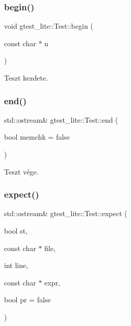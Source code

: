 \subsubsection{\texorpdfstring{begin()}{begin()}}
{\footnotesize\ttfamily void gtest\+\_\+lite\+::\+Test\+::begin (\begin{DoxyParamCaption}\item[{const char $\ast$}]{n }\end{DoxyParamCaption})\hspace{0.3cm}{\ttfamily [inline]}}



Teszt kezdete. 

\mbox{\label{structgtest__lite_1_1_test_a658c1eee35f170294c354ebf4d3fc1ba}} 
\subsubsection{\texorpdfstring{end()}{end()}}
{\footnotesize\ttfamily std\+::ostream\& gtest\+\_\+lite\+::\+Test\+::end (\begin{DoxyParamCaption}\item[{bool}]{memchk = {\ttfamily false} }\end{DoxyParamCaption})\hspace{0.3cm}{\ttfamily [inline]}}



Teszt vége. 

\mbox{\label{structgtest__lite_1_1_test_a0bca03315e5963f7fdfffd92d2daed6a}} 
\subsubsection{\texorpdfstring{expect()}{expect()}}
{\footnotesize\ttfamily std\+::ostream\& gtest\+\_\+lite\+::\+Test\+::expect (\begin{DoxyParamCaption}\item[{bool}]{st,  }\item[{const char $\ast$}]{file,  }\item[{int}]{line,  }\item[{const char $\ast$}]{expr,  }\item[{bool}]{pr = {\ttfamily false} }\end{DoxyParamCaption})\hspace{0.3cm}{\ttfamily [inline]}}



